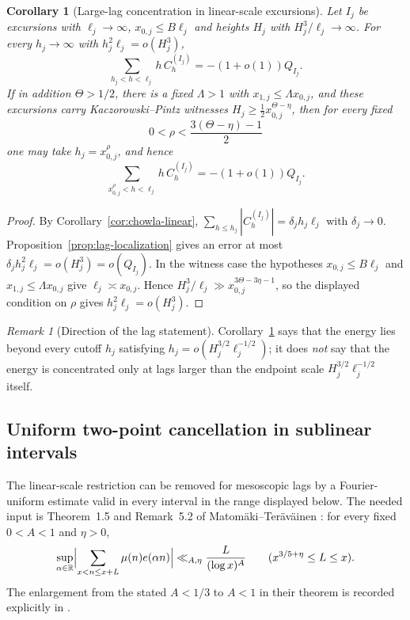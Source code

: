 \documentclass[11pt]{amsart}
\numberwithin{equation}{section}
\theoremstyle{plain}
\newtheorem{corollary}[theorem]{Corollary}
\theoremstyle{definition}
\theoremstyle{remark}
\newtheorem{remark}[theorem]{Remark}
\begin{document}
\begin{corollary}[Large-lag concentration in linear-scale excursions]
\label{cor:large-lag}
Let $I_j$ be excursions with $\ell_j\to\infty$, $x_{0,j}\le B\ell_j$ and
heights $H_j$ with $H_j^3/\ell_j\to\infty$. For every $h_j\to\infty$ with
$h_j^2\ell_j=o(H_j^3)$,
\[
\sum_{h_j<h<\ell_j}h\,C^{(I_j)}_h=-(1+o(1))Q_{I_j}.
\]
If in addition $\Theta>1/2$, there is a fixed $\Lambda>1$ with
$x_{1,j}\le\Lambda x_{0,j}$, and these excursions carry
Kaczorowski--Pintz witnesses
$H_j\ge\frac12x_{0,j}^{\Theta-\eta}$, then for every fixed
\[
0<\rho<\frac{3(\Theta-\eta)-1}{2}
\]
one may take $h_j=x_{0,j}^{\rho}$, and hence
\[
\sum_{x_{0,j}^{\rho}<h<\ell_j}h\,C_h^{(I_j)}=-(1+o(1))Q_{I_j}.
\]
\end{corollary}

\begin{proof}
By Corollary~\ref{cor:chowla-linear},
$\sum_{h\le h_j}|C^{(I_j)}_h|=\delta_jh_j\ell_j$ with $\delta_j\to0$.
Proposition~\ref{prop:lag-localization} gives an error at most
$\delta_jh_j^2\ell_j=o(H_j^3)=o(Q_{I_j})$. In the witness case the hypotheses
$x_{0,j}\le B\ell_j$ and $x_{1,j}\le\Lambda x_{0,j}$ give
$\ell_j\asymp x_{0,j}$.  Hence
$H_j^3/\ell_j\gg x_{0,j}^{3\Theta-3\eta-1}$, so the displayed condition on
$\rho$ gives $h_j^2\ell_j=o(H_j^3)$.
\end{proof}

\begin{remark}[Direction of the lag statement]
\label{rem:large-lag-direction}
Corollary~\ref{cor:large-lag} says that the energy lies beyond every cutoff
$h_j$ satisfying $h_j=o(H_j^{3/2}\ell_j^{-1/2})$; it does \emph{not} say
that the energy is concentrated only at lags larger than the endpoint scale
$H_j^{3/2}\ell_j^{-1/2}$ itself.
\end{remark}

\subsection{Uniform two-point cancellation in sublinear intervals}
\label{subsec:sublinear-chowla}

The linear-scale restriction can be removed for mesoscopic lags by a
Fourier-uniform estimate valid in every interval in the range displayed below. The needed input is
Theorem~1.5 and Remark~5.2 of Matom\"aki--Ter\"av\"ainen
\cite{MatomakiTeravainen2023}: for every fixed $0<A<1$ and $\eta>0$,
\begin{equation}
\label{eq:MT-fourier}
\sup_{\alpha\in\mathbb R}\Bigl|\sum_{x<n\le x+L}\mu(n)e(\alpha n)\Bigr|
\ll_{A,\eta}\frac{L}{(\log x)^A}
\qquad(x^{3/5+\eta}\le L\le x).
\end{equation}
The enlargement from the stated $A<1/3$ to $A<1$ in their theorem is
recorded explicitly in \cite{MSTT23}.
\end{document}
